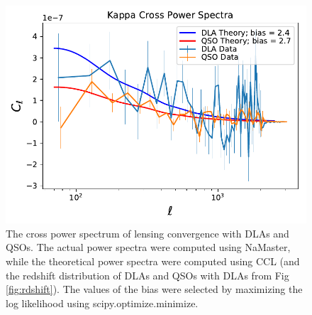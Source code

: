 \documentclass{amsart}
\begin{document}
\begin{figure}
  \includegraphics[width=\linewidth]{cps_predictions_50.pdf}
  \caption{The cross power spectrum of lensing convergence with DLAs and QSOs. The actual power spectra were computed using NaMaster, while the theoretical power spectra were computed using CCL (and the redshift distribution of DLAs and QSOs with DLAs from Fig \ref{fig:rdshift}). The values of the bias were selected by maximizing the log likelihood using scipy.optimize.minimize.}
  \label{fig:cpsdla}
\end{figure}
\end{document}
